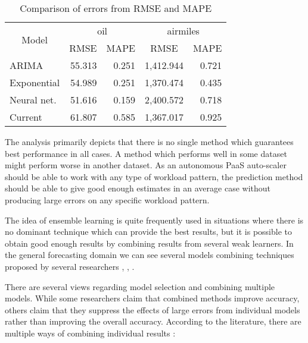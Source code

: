 \begin{table}[]
\centering
\caption{Comparison of errors from RMSE and MAPE}
\label{my-label}
\begin{tabular}{|l|r|r|r|r|}
\hline
\multicolumn{1}{|c|}{\multirow{2}{*}{Model}} & \multicolumn{2}{c|}{oil}                             & \multicolumn{2}{c|}{airmiles}                        \\ \cline{2-5} 
\multicolumn{1}{|c|}{}                       & \multicolumn{1}{c|}{RMSE} & \multicolumn{1}{c|}{MAPE} & \multicolumn{1}{c|}{RMSE} & \multicolumn{1}{c|}{MAPE} \\ \hline
ARIMA                                        & 55.313                 & 0.251                   & 1,412.944              & 0.721                   \\ \hline
Exponential                                  & 54.989                 & 0.251                   & 1,370.474              & 0.435                   \\ \hline
Neural net.                                  & 51.616                 & 0.159                   & 2,400.572              & 0.718                   \\ \hline
Current                                      & 61.807                 & 0.585                   & 1,367.017              & 0.925                   \\ \hline
\end{tabular}
\end{table}

The analysis primarily depicts that there is no single method which guarantees best performance in all cases. A method which performs well in some dataset might perform worse in another dataset. As an autonomous PaaS auto-scaler should be able to work with any type of workload pattern, the prediction method should be able to give good enough estimates in an average case without producing large errors on any specific workload pattern.

The idea of ensemble learning is quite frequently used in situations where there is no dominant technique which can provide the best results, but it is possible to obtain good enough results by combining results from several weak learners. In the general forecasting domain we can see several models combining techniques proposed by several researchers \cite{Wagner_2011}, \cite{Zhang_2003}, \cite{Zou_2004}.

There are several views regarding model selection and combining multiple models. While some researchers claim that combined methods improve accuracy, others claim that they suppress the effects of large errors from individual models rather than improving the overall accuracy. According to the literature, there are multiple ways of combining individual results \cite{Adhikari_2012}:

